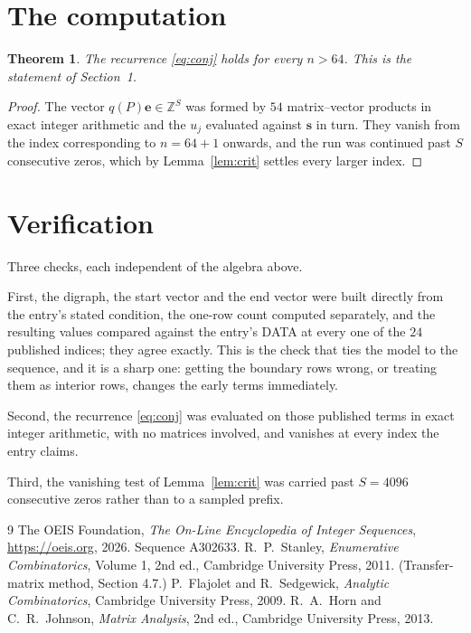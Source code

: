 \documentclass[11pt,a4paper]{article}
\theoremstyle{plain}
\newtheorem{theorem}{Theorem}
\theoremstyle{definition}
\begin{document}
\section{The computation}

\begin{theorem}
The recurrence \eqref{eq:conj} holds for every $n>64$. This is the statement of
Section~1.
\end{theorem}

\begin{proof}
The vector $q(P)\mathbf{e}\in\mathbb{Z}^{S}$ was formed by $54$ matrix--vector
products in exact integer arithmetic and the $u_j$ evaluated against $\mathbf{s}$ in turn.
They vanish from the index corresponding to $n=64+1$ onwards, and the run was continued
past $S$ consecutive zeros, which by Lemma~\ref{lem:crit} settles every larger index.
\end{proof}

\section{Verification}

Three checks, each independent of the algebra above.

First, the digraph, the start vector and the end vector were built directly from the
entry's stated condition, the one-row count computed separately, and the resulting values
compared against the entry's DATA at every one of the $24$ published indices; they
agree exactly. This is the check that ties the model to the sequence, and it is a sharp one:
getting the boundary rows wrong, or treating them as interior rows, changes the early terms
immediately.

Second, the recurrence \eqref{eq:conj} was evaluated on those published terms in exact
integer arithmetic, with no matrices involved, and vanishes at every index the entry claims.

Third, the vanishing test of Lemma~\ref{lem:crit} was carried past $S=4096$ consecutive
zeros rather than to a sampled prefix.

\begin{thebibliography}{9}
 The OEIS Foundation, \emph{The On-Line Encyclopedia of Integer
Sequences}, \url{https://oeis.org}, 2026. Sequence A302633.
 R.~P.~Stanley, \emph{Enumerative Combinatorics}, Volume 1, 2nd ed.,
Cambridge University Press, 2011. (Transfer-matrix method, Section 4.7.)
 P.~Flajolet and R.~Sedgewick, \emph{Analytic Combinatorics}, Cambridge
University Press, 2009.
 R.~A.~Horn and C.~R.~Johnson, \emph{Matrix Analysis}, 2nd ed., Cambridge
University Press, 2013.
\end{thebibliography}
\end{document}
